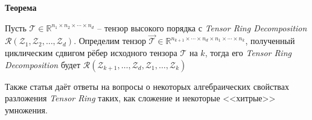\textbf{Теорема}


Пусть $\mathcal{T} \in \mathbb{R}^{n_1 \times n_2 \times \dotsm \times n_d}$ -- тензор высокого порядка с \textit{Tensor Ring Decomposition} $\mathcal{R}(\mathcal{Z}_1, \mathcal{Z}_2, \dotsc, \mathcal{Z}_d)$. Определим тензор $\vec{\mathcal{T}} \in \mathbb{R}^{n_{k + 1} \times \dotsm \times n_d \times n_1 \times \dotsm \times n_k}$, полученный циклическим сдвигом рёбер исходного тензора $\mathcal{T}$ на $k$, тогда его \textit{Tensor Ring Decomposition} будет $\mathcal{R}(\mathcal{Z}_{k + 1}, \dotsc, \mathcal{Z}_d,  \mathcal{Z}_1, \dotsc, \mathcal{Z}_k)$

Также статья даёт ответы на вопросы о некоторых алгебраических свойствах разложения \textit{Tensor Ring} таких, как сложение и некоторые <<хитрые>> умножения.